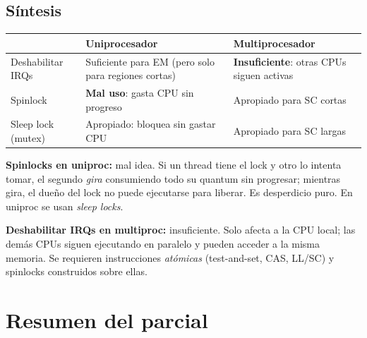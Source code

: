 \documentclass[11pt,a4paper]{article}
\begin{document}
\subsection*{Síntesis}

\begin{center}
\small
\begin{tabular}{@{}p{4.5cm}p{4.2cm}p{4.2cm}@{}}
\toprule
& \textbf{Uniprocesador} & \textbf{Multiprocesador} \\
\midrule
Deshabilitar IRQs & Suficiente para EM (pero solo para regiones cortas) & \textbf{Insuficiente}: otras CPUs siguen activas \\
Spinlock & \textbf{Mal uso}: gasta CPU sin progreso & Apropiado para SC cortas \\
Sleep lock (mutex) & Apropiado: bloquea sin gastar CPU & Apropiado para SC largas \\
\bottomrule
\end{tabular}
\end{center}

\begin{respuesta}
\textbf{Spinlocks en uniproc:} mal idea. Si un thread tiene el lock
y otro lo intenta tomar, el segundo \emph{gira} consumiendo todo
su quantum sin progresar; mientras gira, el dueño del lock no puede
ejecutarse para liberar. Es desperdicio puro. En uniproc se usan
\emph{sleep locks}.

\textbf{Deshabilitar IRQs en multiproc:} insuficiente. Solo afecta a
la CPU local; las demás CPUs siguen ejecutando en paralelo y pueden
acceder a la misma memoria. Se requieren instrucciones \emph{atómicas}
(test-and-set, CAS, LL/SC) y spinlocks construidos sobre ellas.
\end{respuesta}

\section*{Resumen del parcial}
\end{document}

